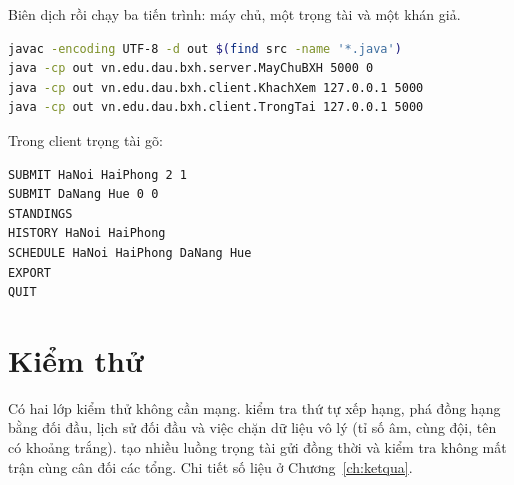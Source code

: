 Biên dịch rồi chạy ba tiến trình: máy chủ, một trọng tài và một khán giả.

\begin{lstlisting}[language=bash, caption={Biên dịch và chạy.}]
javac -encoding UTF-8 -d out $(find src -name '*.java')
java -cp out vn.edu.dau.bxh.server.MayChuBXH 5000 0
java -cp out vn.edu.dau.bxh.client.KhachXem 127.0.0.1 5000
java -cp out vn.edu.dau.bxh.client.TrongTai 127.0.0.1 5000
\end{lstlisting}

Trong client trọng tài gõ:
\begin{lstlisting}[language=bash]
SUBMIT HaNoi HaiPhong 2 1
SUBMIT DaNang Hue 0 0
STANDINGS
HISTORY HaNoi HaiPhong
SCHEDULE HaNoi HaiPhong DaNang Hue
EXPORT
QUIT
\end{lstlisting}

\section{Kiểm thử}

Có hai lớp kiểm thử không cần mạng.  kiểm tra thứ tự xếp hạng,
phá đồng hạng bằng đối đầu, lịch sử đối đầu và việc chặn dữ liệu vô lý (tỉ số
âm, cùng đội, tên có khoảng trắng).  tạo nhiều luồng trọng
tài gửi đồng thời và kiểm tra không mất trận cùng cân đối các tổng. Chi tiết số
liệu ở Chương~\ref{ch:ketqua}.
